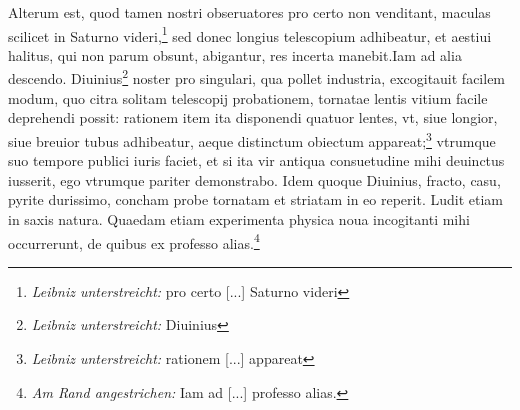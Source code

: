\pend \pstart [p.~231] Alterum est, quod tamen nostri obseruatores pro certo non venditant, maculas scilicet in Saturno\protect{} videri,\footnote{\textit{Leibniz unterstreicht:} pro certo [...] Saturno videri} sed donec longius telescopium\protect{} adhibeatur, et aestiui halitus, qui non parum obsunt, abigantur, res incerta manebit.\pend \pstart Iam ad alia descendo. Diuinius\protect{}\footnote{\textit{Leibniz unterstreicht:} Diuinius} noster pro singulari, qua pollet industria, excogitauit facilem modum, quo citra solitam telescopij\protect{} probationem, tornatae lentis\protect{} vitium facile deprehendi possit: rationem item ita disponendi quatuor lentes\protect{}, vt, siue longior, siue breuior tubus adhibeatur, aeque distinctum obiectum appareat;\footnote{\textit{Leibniz unterstreicht:} rationem [...] appareat} vtrumque suo tempore publici iuris faciet, et si ita vir antiqua consuetudine mihi deuinctus iusserit, ego vtrumque pariter demonstrabo. Idem quoque Diuinius\protect{}, fracto, casu, pyrite durissimo, concham probe tornatam et striatam in eo reperit. Ludit etiam in saxis natura. Quaedam etiam experimenta physica noua incogitanti mihi occurrerunt, de quibus ex professo alias.\footnote{\textit{Am Rand angestrichen:} Iam ad [...] professo alias.}